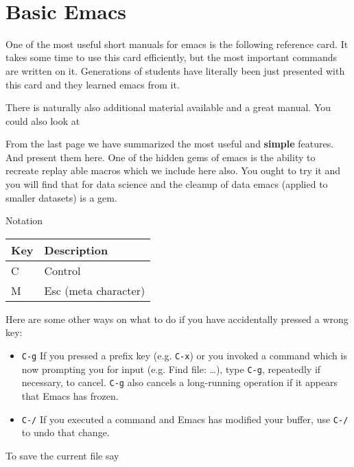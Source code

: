 
\FILENAME\

\section{Basic Emacs}
\label{C:emacs}

One of the most useful short manuals for emacs is the following reference
card. It takes some time to use this card efficiently, but the most
important commands are written on it. Generations of students have
literally been just presented with this card and they learned emacs
from it.



There is naturally also additional material available and a great
manual. You could also look at



From the last page we have summarized the most useful and
\textbf{simple} features. And present them here. One of the hidden gems
of emacs is the ability to recreate replay able macros which we include
here also. You ought to try it and you will find that for data science
and the cleanup of data emacs (applied to smaller datasets) is a gem.

Notation

\begin{longtable}[]{@{}ll@{}}
\toprule
Key & Description\tabularnewline
\midrule
\endhead
C & Control\tabularnewline
M & Esc (meta character)\tabularnewline
\bottomrule
\end{longtable}

Here are some other ways on what to do if you have accidentally
pressed a wrong key:

\begin{itemize}
\item \verb|C-g| If you pressed a prefix key (e.g. \verb|C-x|) or you invoked
a command which is now prompting you for input (e.g. Find file:
\ldots{}), type \verb|C-g|, repeatedly if necessary, to cancel. \verb|C-g| also
cancels a long-running operation if it appears that Emacs has frozen.

\item \verb|C-/| If you executed a command and Emacs has modified your buffer, use \verb|C-/| to
undo that change. 
\end{itemize}

To save the current file say 

